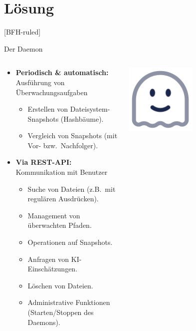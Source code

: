 \documentclass[
	ngerman,%
	authorontitle=true,
	]{bfhbeamer}
\begin{document}
\section{Lösung}\label{sec:loesung}
[BFH-ruled]
\frame{\sectionpage}

\begin{frame}{Der Daemon}
	\begin{columns}
		\begin{column}{0.7\textwidth}
			\begin{itemize}
				\item \textbf{Periodisch \& automatisch:} Ausführung von Überwachungsaufgaben
				\begin{itemize}
					\item Erstellen von Dateisystem-Snapshots (Hashbäume).
					\item Vergleich von Snapshots (mit Vor- bzw.\ Nachfolger).
				\end{itemize}
				\item \textbf{Via REST-API:} Kommunikation mit Benutzer
				\begin{itemize}
						  \item Suche von Dateien (z.B.\ mit regulären Ausdrücken).
						  \item Management von überwachten Pfaden.
						  \item Operationen auf Snapshots.
						  \item Anfragen von KI-Einschätzungen.
						  \item Löschen von Dateien.
						  \item Administrative Funktionen (Starten/Stoppen des Daemons).
				\end{itemize}
			\end{itemize}
		\end{column}
		\begin{column}{0.3\textwidth}
			\begin{center}
				\includegraphics[width=0.5\textwidth]{assets/presentation/ghost-smile}
			\end{center}
		\end{column}
	\end{columns}

\end{frame}
\end{document}
